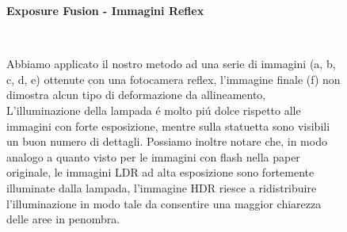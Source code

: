 \documentclass[10pt,journal,cspaper,compsoc]{IEEEtran}
\newcommand*{\figuretitle}[1]{%
    {\centering%
    \textbf{#1}%
    \par\medskip}%
}
\begin{document}
\begin{figure}[ht]
    \centering
    \figuretitle{Exposure Fusion - Immagini Reflex} 
     \hfill
     \hfill
    \\[0pt]
     \hfill
     \hfill
     \hfill

    \caption[Commento Reflex.]{
        Abbiamo applicato il nostro metodo ad una serie di immagini (a, b, c, d, e) ottenute con una fotocamera reflex,
        l'immagine finale (f) non dimostra alcun tipo di deformazione da allineamento, L'illuminazione della lampada 
        é molto piú dolce rispetto alle immagini con forte esposizione, mentre sulla statuetta sono visibili un buon 
        numero di dettagli. Possiamo inoltre notare che, in modo analogo a quanto visto per le immagini con flash nella 
        paper originale\cite{stanford:exposure_fusion}, le immagini LDR ad alta esposizione sono fortemente illuminate 
        dalla lampada, l'immagine HDR riesce a ridistribuire l'illuminazione in modo tale da consentire una maggior 
        chiarezza delle aree in penombra.}\label{fig:fusion}

\end{figure}
\end{document}
